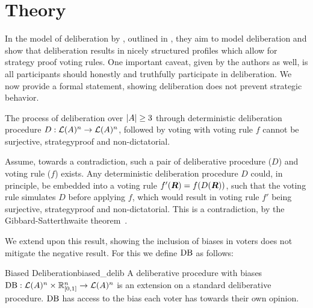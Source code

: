 \newpage \chapter{Theory} \label{theory}


In the model of deliberation by
\citet{radDeliberationSinglePeakednessCoherent2021}, outlined in
, they aim to model deliberation and show that
deliberation results in nicely structured profiles which allow for strategy
proof voting rules. One important caveat, given by the authors as well, is all
participants should honestly and truthfully participate in deliberation. We now
provide a formal statement, showing deliberation does not prevent strategic
behavior.

\begin{proposition} The process of deliberation over $|A| \geq 3$
	through deterministic deliberation procedure \({D}:
	\mathcal{L}(A)^n \to \mathcal{L}(A)^n\), followed by voting
	with voting rule $f$ cannot be surjective, strategyproof and
	non-dictatorial.

	\label{proposition:deterministic-delib} \end{proposition}

\begin{proofc} Assume, towards a contradiction, such a pair of deliberative
	procedure ($D$) and voting rule (\(f\)) exists. Any deterministic deliberation
	procedure $D$ could, in principle, be embedded into a voting rule
	$f'(\boldsymbol{R}) = f(D(\boldsymbol{R}))$, such that the voting rule
	simulates $D$ before applying $f$, which would result in  voting rule $f'$
	being surjective, strategyproof and non-dictatorial. This is a contradiction,
	by the Gibbard-Satterthwaite
	theorem~\citep{gibbardManipulationVotingSchemes1973,satterthwaiteStrategyproofnessArrowsConditions1975}.
\end{proofc}


We extend upon this result, showing the inclusion of biases in voters does not
mitigate the negative result. For this we define $\operatorname{DB}$ as
follows:

\begin{definition}{Biased Deliberation}{biased_delib} A deliberative procedure
	with biases $\operatorname{DB} : \mathcal{L}(A) ^ n \times
		\mathbb{R}_{[0,1]}^n \to \mathcal{L}(A)^n$ is an extension on a
	standard deliberative procedure. \(\operatorname{DB}\) has access to
	the bias each voter has towards their own opinion. \end{definition}

